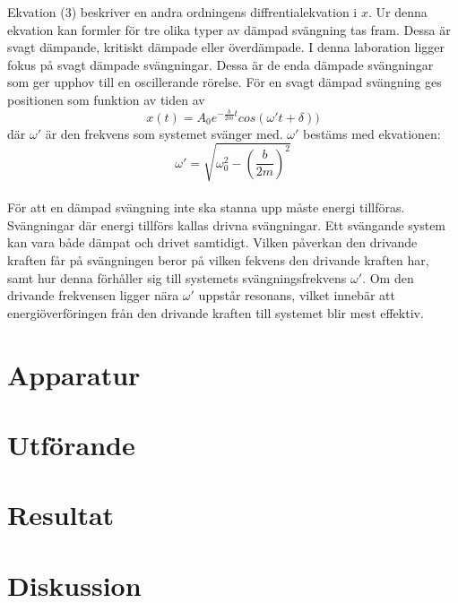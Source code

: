 \documentclass[a4paper,10pt]{article}
\begin{document}
Ekvation (3) beskriver en andra ordningens diffrentialekvation i $x$. Ur denna ekvation kan formler för tre olika typer av dämpad svängning tas fram. Dessa är svagt dämpande, kritiskt dämpade eller överdämpade. I denna laboration ligger fokus på svagt dämpade svängningar. Dessa är de enda dämpade svängningar som ger upphov till en oscillerande rörelse. För en svagt dämpad svängning ges positionen som funktion av tiden av
\begin{equation}
	x(t) = A_0e^{-\frac{b}{2m}t}cos(\omega't + \delta))
\end{equation}
där $\omega'$ är den frekvens som systemet svänger med. $\omega'$ bestäms med ekvationen:
\begin{equation}
	\omega' = \sqrt{\omega_0^2-(\frac{b}{2m})^2}
\end{equation}
\\
\indent För att en dämpad svängning inte ska stanna upp måste energi tillföras. Svängningar där energi tillförs kallas drivna svängningar. Ett svängande system kan vara både dämpat och drivet samtidigt. Vilken påverkan den drivande kraften får på svängningen beror på vilken fekvens den drivande kraften har, samt hur denna förhåller sig till systemets svängningsfrekvens $\omega'$. Om den drivande frekvensen ligger nära $\omega'$ uppstår resonans, vilket innebär att energiöverföringen från den drivande kraften till systemet blir mest effektiv.

\section{Apparatur}


\section{Utförande}

\section{Resultat}

\section{Diskussion}
\end{document}
